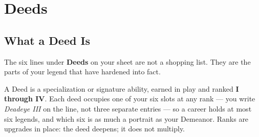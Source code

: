%
%

\chapter{Deeds}

\section{What a Deed Is}

The six lines under \textbf{Deeds} on your sheet are not a shopping list. They are the parts of your legend that have hardened into fact.

A Deed is a specialization or signature ability, earned in play and ranked \textbf{I through IV}. Each deed occupies one of your six slots at any rank --- you write \textit{Deadeye III} on the line, not three separate entries --- so a career holds at most six legends, and which six is as much a portrait as your Demeanor. Ranks are upgrades in place: the deed deepens; it does not multiply.

